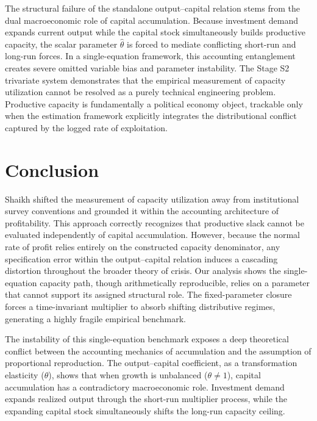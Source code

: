 \documentclass[11pt]{article}
\begin{document}
The structural failure of the standalone output--capital relation stems from the dual macroeconomic role of capital accumulation. Because investment demand expands current output while the capital stock simultaneously builds productive capacity, the scalar parameter $\hat{\theta}$ is forced to mediate conflicting short-run and long-run forces. In a single-equation framework, this accounting entanglement creates severe omitted variable bias and parameter instability. The Stage S2 trivariate system demonstrates that the empirical measurement of capacity utilization cannot be resolved as a purely technical engineering problem. Productive capacity is fundamentally a political economy object, trackable only when the estimation framework explicitly integrates the distributional conflict captured by the logged rate of exploitation.

\section{Conclusion}
\label{sec:conclusion}

Shaikh shifted the measurement of capacity utilization away from institutional survey conventions and grounded it within the accounting architecture of profitability. This approach correctly recognizes that productive slack cannot be evaluated independently of capital accumulation. However, because the normal rate of profit relies entirely on the constructed capacity denominator, any specification error within the output--capital relation induces a cascading distortion throughout the broader theory of crisis. Our analysis shows the single-equation capacity path, though arithmetically reproducible, relies on a parameter that cannot support its assigned structural role. The fixed-parameter closure forces a time-invariant multiplier to absorb shifting distributive regimes, generating a highly fragile empirical benchmark.

The instability of this single-equation benchmark exposes a deep theoretical conflict between the accounting mechanics of accumulation and the assumption of proportional reproduction. The output--capital coefficient, as a transformation elasticity ($\theta$), shows that when growth is unbalanced ($\theta \neq 1$), capital accumulation has a contradictory macroeconomic role. Investment demand expands realized output through the short-run multiplier process, while the expanding capital stock simultaneously shifts the long-run capacity ceiling.
\end{document}
